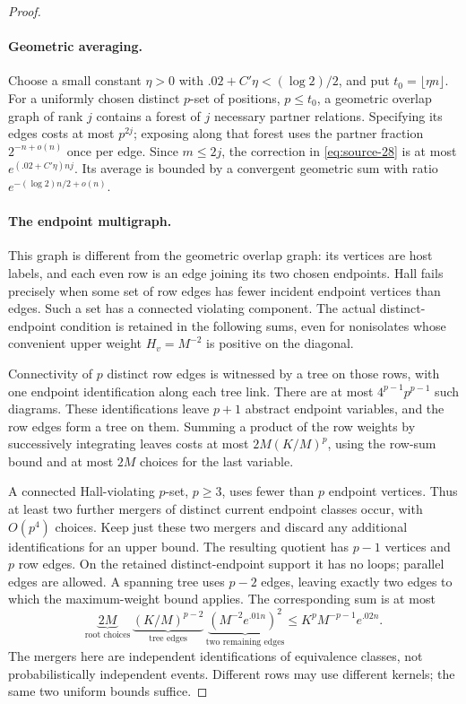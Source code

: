 \begin{proof}\leavevmode\par
\paragraph{Geometric averaging.}
Choose a small constant \(\eta>0\) with
\(.02+C'\eta<(\log2)/2\), and put \(t_0=\lfloor\eta n\rfloor\).
For a uniformly chosen distinct \(p\)-set of positions, \(p\le t_0\),
a geometric overlap graph of rank \(j\) contains a forest of \(j\)
necessary partner relations. Specifying its edges costs at most
\(p^{2j}\); exposing along that forest uses the partner fraction
\(2^{-n+o(n)}\) once per edge. Since \(m\le2j\), the correction in
\eqref{eq:source-28} is at most
\(e^{(.02+C'\eta)nj}\). Its average is bounded by a convergent
geometric sum with ratio \(e^{-(\log2)n/2+o(n)}\).

\paragraph{The endpoint multigraph.}
This graph is different from the geometric overlap graph: its vertices
are host labels, and each even row is an edge joining its two chosen
endpoints. Hall fails precisely when some set of row edges has fewer
incident endpoint vertices than edges. Such a set has a connected
violating component. The actual distinct-endpoint condition is retained
in the following sums, even for nonisolates whose convenient upper
weight \(H_v=M^{-2}\) is positive on the diagonal.

Connectivity of \(p\) distinct row edges is witnessed by a tree on
those rows, with one endpoint identification along each tree link.
There are at most \(4^{p-1}p^{p-1}\) such diagrams. These identifications
leave \(p+1\) abstract endpoint variables, and the row edges form a
tree on them. Summing a product of the row weights by successively
integrating leaves costs at most \(2M(K/M)^p\), using the row-sum
bound and at most \(2M\) choices for the last variable.

A connected Hall-violating \(p\)-set, \(p\ge3\), uses fewer than
\(p\) endpoint vertices. Thus at least two further mergers of distinct
current endpoint classes occur, with \(O(p^4)\) choices. Keep just
these two mergers and discard any additional identifications for an
upper bound. The resulting quotient has \(p-1\) vertices and \(p\)
row edges. On the retained distinct-endpoint support it has no loops;
parallel edges are allowed. A spanning tree uses \(p-2\) edges,
leaving exactly two edges to which the maximum-weight bound applies.
The corresponding sum is at most
\[
 \underbrace{2M}_{\text{root choices}}\,
 \underbrace{(K/M)^{p-2}}_{\text{tree edges}}\,
 \underbrace{(M^{-2}e^{.01n})^2}_{\text{two remaining edges}}
 \le K^pM^{-p-1}e^{.02n}.
\]
The mergers here are independent identifications of equivalence classes,
not probabilistically independent events. Different rows may use
different kernels; the same two uniform bounds suffice.


\end{proof}
